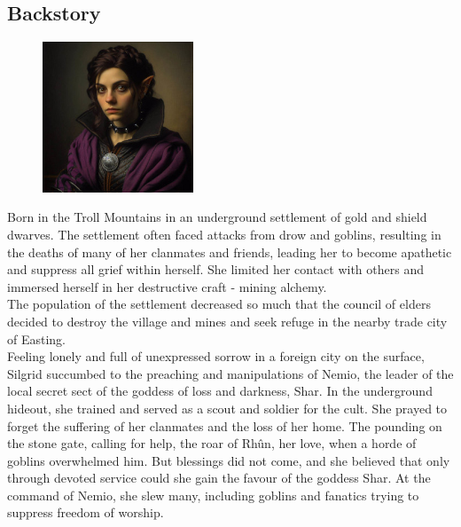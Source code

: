 \documentclass[10pt,onecolumn,twoside,openany,bg=full,layout=true]{dndbook}
\begin{document}
\subsection{Backstory}\label{subsec:silgrid-backstory}
\begin{figure}
  \begin{center}
    \includegraphics[width=0.4\textwidth]{img/silgrid}
    \vspace{1cm}
  \end{center}
\end{figure}

Born in the Troll Mountains in an underground settlement of gold and shield dwarves.
The settlement often faced attacks from drow and goblins, resulting in the deaths of many of her clanmates and friends,
leading her to become apathetic and suppress all grief within herself.
She limited her contact with others and immersed herself in her destructive craft - mining alchemy.\\

The population of the settlement decreased so much that the council of elders decided to destroy the village and mines
and seek refuge in the nearby trade city of Easting.\\

Feeling lonely and full of unexpressed sorrow in a foreign city on the surface, Silgrid succumbed to the preaching and
manipulations of Nemio, the leader of the local secret sect of the goddess of loss and darkness, Shar.
In the underground hideout, she trained and served as a scout and soldier for the cult.
She prayed to forget the suffering of her clanmates and the loss of her home.
The pounding on the stone gate, calling for help, the roar of Rhûn, her love, when a horde of goblins overwhelmed him.
But blessings did not come, and she believed that only through devoted service could she gain the favour of the goddess Shar.
At the command of Nemio, she slew many, including goblins and fanatics trying to suppress freedom of worship.\\
\end{document}
